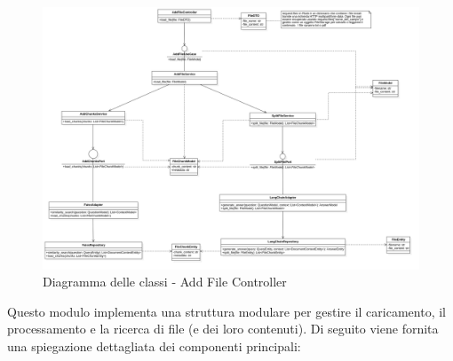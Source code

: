     \begin{figure}[H]
        \centering
        \includegraphics[width=\linewidth, height=0.8\textheight, keepaspectratio]{./img/png/Model2!AddFileController_2.png}
        \caption{Diagramma delle classi - Add File Controller}
        \label{fig:add_file_controller}
    \end{figure}

    Questo modulo implementa una struttura modulare per gestire il caricamento, il processamento e la ricerca di file (e dei loro contenuti). Di seguito viene fornita una spiegazione dettagliata dei componenti principali:

